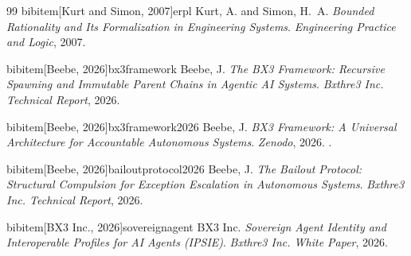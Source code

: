 \begin{thebibliography}{99}
bibitem[Kurt and Simon, 2007]{erpl}
 Kurt, A. and Simon, H.~A. \newblock \emph{Bounded Rationality and Its Formalization in Engineering Systems}.
 \newblock \emph{Engineering Practice and Logic}, 2007.

bibitem[Beebe, 2026]{bx3framework}
 Beebe, J. \newblock \emph{The BX3 Framework: Recursive Spawning and Immutable Parent Chains in Agentic AI Systems}.
 \newblock \emph{Bxthre3 Inc. Technical Report}, 2026.

bibitem[Beebe, 2026]{bx3framework2026}
 Beebe, J. \newblock \emph{BX3 Framework: A Universal Architecture for Accountable Autonomous Systems}.
 \newblock \emph{Zenodo}, 2026. .

bibitem[Beebe, 2026]{bailoutprotocol2026}
 Beebe, J. \newblock \emph{The Bailout Protocol: Structural Compulsion for Exception Escalation in Autonomous Systems}.
 \newblock \emph{Bxthre3 Inc. Technical Report}, 2026.

bibitem[BX3 Inc., 2026]{sovereignagent}
 BX3 Inc. \newblock \emph{Sovereign Agent Identity and Interoperable Profiles for AI Agents (IPSIE)}.
 \newblock \emph{Bxthre3 Inc. White Paper}, 2026.

\end{thebibliography}